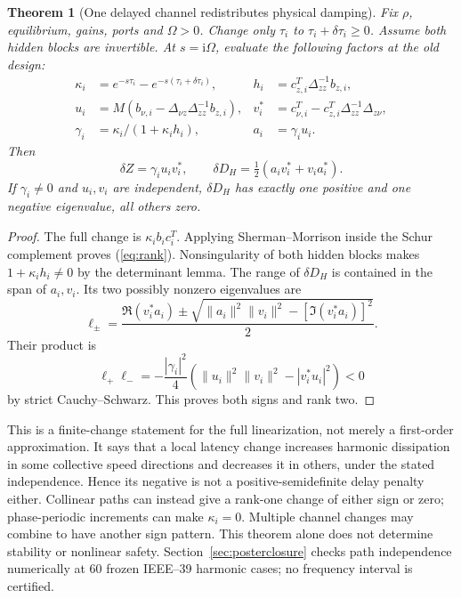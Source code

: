 \documentclass[11pt]{article}
\newtheorem{theorem}{Theorem}
\newcommand{\ii}{\mathrm{i}}
\begin{document}
\begin{theorem}[One delayed channel redistributes physical damping]
Fix $\rho$, equilibrium, gains, ports and $\Omega>0$.
Change only $\tau_i$ to $\tau_i+\delta\tau_i\geq0$.
Assume both hidden blocks are invertible. At $s=\ii\Omega$, evaluate
the following factors at the old design:
\begin{align*}
 \kappa_i&=e^{-s\tau_i}-e^{-s(\tau_i+\delta\tau_i)},&
 h_i&=c_{z,i}^T\Delta_{zz}^{-1}b_{z,i},\\
 u_i&=M(b_{\nu,i}-\Delta_{\nu z}\Delta_{zz}^{-1}b_{z,i}),&
 v_i^*&=c_{\nu,i}^T-c_{z,i}^T\Delta_{zz}^{-1}\Delta_{z\nu},\\
 \gamma_i&=\kappa_i/(1+\kappa_i h_i),&
 a_i&=\gamma_i u_i .
\end{align*}
Then
\begin{equation}
 \boxed{\delta Z=\gamma_i u_iv_i^*,\qquad
 \delta D_H=\tfrac12(a_iv_i^*+v_ia_i^*).} \label{eq:rank}
\end{equation}
If $\gamma_i\ne0$ and $u_i,v_i$ are independent, $\delta D_H$ has
exactly one positive and one negative eigenvalue, all others zero.
\end{theorem}
\begin{proof}
The full change is $\kappa_i b_ic_i^T$. Applying Sherman--Morrison
inside the Schur complement proves (\ref{eq:rank}). Nonsingularity of
both hidden blocks makes $1+\kappa_i h_i\ne0$ by the determinant lemma.
The range of $\delta D_H$ is contained in the span of $a_i,v_i$.
Its two possibly nonzero eigenvalues are
\[
 \ell_\pm=\frac{\Re(v_i^*a_i)\pm
 \sqrt{\|a_i\|^2\|v_i\|^2-[\Im(v_i^*a_i)]^2}}{2}.
\]
Their product is
\[
 \ell_+\ell_-=-\frac{|\gamma_i|^2}{4}
 \left(\|u_i\|^2\|v_i\|^2-|v_i^*u_i|^2\right)<0
\]
by strict Cauchy--Schwarz. This proves both signs and rank two.
\end{proof}
This is a finite-change statement for the full linearization, not
merely a first-order approximation. It says that a local latency
change increases harmonic dissipation in some collective speed
directions and decreases it in others, under the stated independence.
Hence its negative is not a positive-semidefinite delay penalty either.
Collinear paths can instead give a rank-one change of either sign or
zero; phase-periodic increments can make $\kappa_i=0$.
Multiple channel changes may combine to have another sign pattern.
This theorem alone does not determine stability or nonlinear safety.
Section~\ref{sec:posterclosure} checks path independence numerically at 60 frozen IEEE--39 harmonic cases; no frequency interval is certified.
\end{document}

